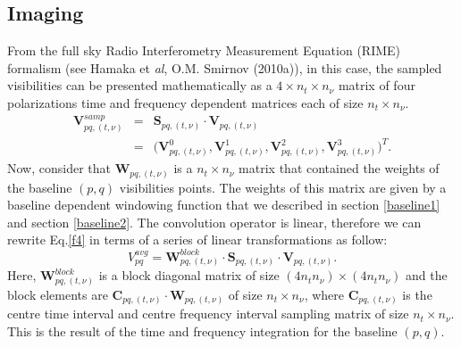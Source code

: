 \documentclass[useAMS,usenatbib]{mn2e}
\begin{document}
\subsection{Imaging}
From the full sky Radio Interferometry Measurement Equation (RIME) formalism (see Hamaka et \textit{al}, O.M. Smirnov (2010a)), in this 
case, the sampled visibilities can be presented mathematically as a $4\times n_t\times n_{\nu}$ matrix of four polarizations time and 
frequency dependent matrices each of size $n_t\times n_{\nu}$.
\begin{eqnarray*}
\mathbf{V}_{pq,(t,\nu)}^{samp}&=&\mathcal{\textbf{S}}_{pq,(t,\nu)}\cdot\mathbf{V}_{pq,(t,\nu)}\\
			      &=&\Bigg(\mathbf{V}_{pq,(t,\nu)}^{0},\mathbf { V } 
^1_{pq,(t,\nu)},\mathbf{V}^2_{pq,(t,\nu)},\mathbf{V}_{pq,(t,\nu)}^{3 } \Bigg)^T. \label{eqx:conv}
\end{eqnarray*}
Now, consider that $\mathcal{\textbf{W}}_{pq,(t,\nu)}$ is a $n_t \times n_{\nu}$ matrix that contained the weights of the baseline $(p,q)$ 
visibilities points. The weights of this matrix are given by a baseline dependent windowing function that we described in section 
\ref{baseline1} and section \ref{baseline2}.
The convolution operator is linear, therefore we can rewrite Eq.\ref{f4} in terms of a series of linear transformations as follow:
\begin{equation}
V_{pq}^{avg}= \mathbf{W}_{pq,(t,\nu)}^{block}\cdot 
\mathbf{S}_{pq,(t,\nu)}\cdot\mathbf{V}_{pq,(t,\nu)}.\label{eqbb:linear}
\end{equation}
Here, $\mathbf{W}_{pq,(t,\nu)}^{block}$ is a block diagonal matrix of size $(4n_t n_{\nu})\times(4n_t n_{\nu})$ and the 
block elements are $\mathbf{C}_{pq,(t,\nu)}\cdot\mathcal{\textbf{W}}_{pq,(t,\nu)}$ of size $n_t\times n_{\nu}$, where 
$\mathbf{C}_{pq,(t,\nu)}$ is the centre time interval and centre frequency interval sampling matrix of size $n_t\times n_{\nu}$. This
is the result of the time and frequency integration for the baseline $(p,q)$.
\end{document}
